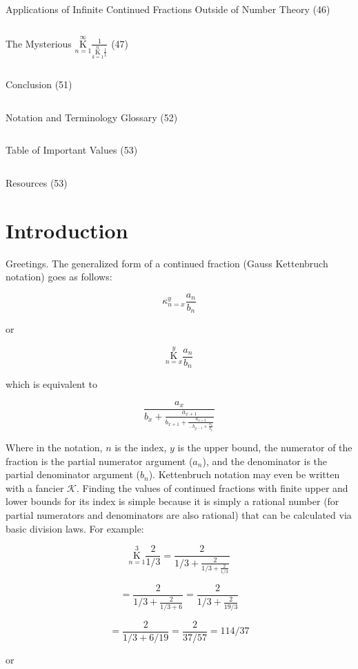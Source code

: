 \documentclass{article}
\begin{document}
$${}$$

Applications of Infinite Continued Fractions Outside of Number Theory (46)

$${}$$

The Mysterious $\underset{n=1}{\overset{\infty}{ \mathrm K}} \frac{1}{ \underset{k=1}{\overset{n}{ \mathrm K}} \frac{1}{1} } $ (47)

$${}$$

Conclusion (51)

$${}$$

Notation and Terminology Glossary (52)

$${}$$

Table of Important Values (53)

$${}$$

Resources (53)

\section{Introduction}

Greetings. The generalized form of a continued fraction (Gauss Kettenbruch notation) goes as follows:

$$ \kappa_{n=x}^{y} \frac{a_n}{b_n} $$

or

$$ \underset{n=x}{\overset{y}{ \mathrm K}} \frac{a_n}{b_n}$$

which is equivalent to

$$ \frac{a_x}{b_x + \frac{a_{x+1}}{b_{x+1} + \frac{a_{x+2}}{... b_{y-1} + \frac{a_y}{b_y}}}} $$

Where in the notation, $n$ is the index, $y$ is the upper bound, the numerator of the fraction is the partial numerator argument ($a_n$), and the denominator is the partial denominator argument ($b_n$). Kettenbruch notation may even be written with a fancier $\mathcal{K}$. Finding the values of continued fractions with finite upper and lower bounds for its index is simple because it is simply a rational number (for partial numerators and denominators are also rational) that can be calculated via basic division laws. For example: 

$$ \underset{n=1}{\overset{3}{ \mathrm K}} \frac{2}{1/3} = \frac{2}{1/3 + \frac{2}{1/3 + \frac{2}{1/3}}} $$

$$= \frac{2}{1/3 + \frac{2}{1/3 + 6}} = \frac{2}{1/3 + \frac{2}{19/3}} $$

$$= \frac{2}{1/3 + 6/19} = \frac{2}{37/57} = 114/37 $$

or
\end{document}
